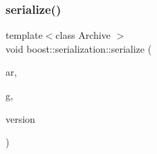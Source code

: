 \subsubsection{\texorpdfstring{serialize()}{serialize()}\hspace{0.1cm}{\footnotesize\ttfamily [3/3]}}
{\footnotesize\ttfamily template$<$class Archive $>$ \\
void boost\+::serialization\+::serialize (\begin{DoxyParamCaption}\item[{Archive \&}]{ar,  }\item[{\hyperlink{structpan_1_1_player_data}{pan\+::\+Player\+Data} \&}]{g,  }\item[{const unsigned int}]{version }\end{DoxyParamCaption})}

